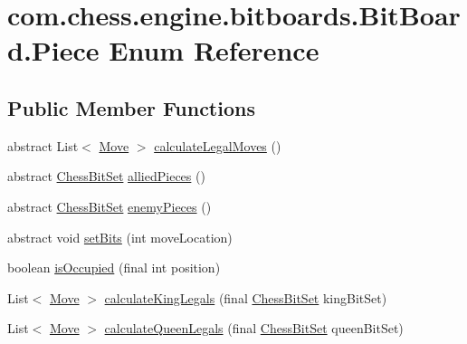 \hypertarget{enumcom_1_1chess_1_1engine_1_1bitboards_1_1_bit_board_1_1_piece}{}\section{com.\+chess.\+engine.\+bitboards.\+Bit\+Board.\+Piece Enum Reference}
\label{enumcom_1_1chess_1_1engine_1_1bitboards_1_1_bit_board_1_1_piece}
\subsection*{Public Member Functions}
\begin{DoxyCompactItemize}
\item 
abstract List$<$ \mbox{\hyperlink{classcom_1_1chess_1_1engine_1_1bitboards_1_1_move}{Move}} $>$ \mbox{\hyperlink{enumcom_1_1chess_1_1engine_1_1bitboards_1_1_bit_board_1_1_piece_aaa5391b24427b9fa03c736809e53d6fe}{calculate\+Legal\+Moves}} ()
\item 
abstract \mbox{\hyperlink{classcom_1_1chess_1_1engine_1_1bitboards_1_1_chess_bit_set}{Chess\+Bit\+Set}} \mbox{\hyperlink{enumcom_1_1chess_1_1engine_1_1bitboards_1_1_bit_board_1_1_piece_a97af3199ff4c1a0ab1cec27492ec202e}{allied\+Pieces}} ()
\item 
abstract \mbox{\hyperlink{classcom_1_1chess_1_1engine_1_1bitboards_1_1_chess_bit_set}{Chess\+Bit\+Set}} \mbox{\hyperlink{enumcom_1_1chess_1_1engine_1_1bitboards_1_1_bit_board_1_1_piece_a7d43096ebdd9c1ee9ba9dc7c65f415e9}{enemy\+Pieces}} ()
\item 
abstract void \mbox{\hyperlink{enumcom_1_1chess_1_1engine_1_1bitboards_1_1_bit_board_1_1_piece_ab074918caa6654dc20c0bd29893ee651}{set\+Bits}} (int move\+Location)
\item 
boolean \mbox{\hyperlink{enumcom_1_1chess_1_1engine_1_1bitboards_1_1_bit_board_1_1_piece_aebd48b944098e984ea8f1a256b412398}{is\+Occupied}} (final int position)
\item 
List$<$ \mbox{\hyperlink{classcom_1_1chess_1_1engine_1_1bitboards_1_1_move}{Move}} $>$ \mbox{\hyperlink{enumcom_1_1chess_1_1engine_1_1bitboards_1_1_bit_board_1_1_piece_a3f7038593519a8c94268b9d840e675d8}{calculate\+King\+Legals}} (final \mbox{\hyperlink{classcom_1_1chess_1_1engine_1_1bitboards_1_1_chess_bit_set}{Chess\+Bit\+Set}} king\+Bit\+Set)
\item 
List$<$ \mbox{\hyperlink{classcom_1_1chess_1_1engine_1_1bitboards_1_1_move}{Move}} $>$ \mbox{\hyperlink{enumcom_1_1chess_1_1engine_1_1bitboards_1_1_bit_board_1_1_piece_ad5088261ffd0bc39a292f025118f3d78}{calculate\+Queen\+Legals}} (final \mbox{\hyperlink{classcom_1_1chess_1_1engine_1_1bitboards_1_1_chess_bit_set}{Chess\+Bit\+Set}} queen\+Bit\+Set)

\end{DoxyCompactItemize}

